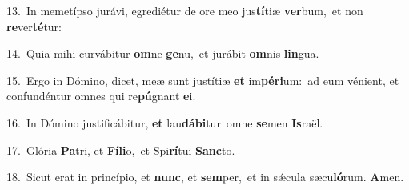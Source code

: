 {\numbfont\textcolor{\numbcolor}{13.}}~In memetípso jurávi, egrediétur de ore meo jus\-\textbf{tí}\-tiæ \textbf{ver}\-bum,~\star et non \textbf{re}\-ver\-\textbf{té}\-tur:\par
{\numbfont\textcolor{\numbcolor}{14.}}~Quia mihi curvábitur \textbf{om}\-ne \textbf{ge}\-nu,~\star et jurábit \textbf{om}\-nis \textbf{lin}\-gua.\par
{\numbfont\textcolor{\numbcolor}{15.}}~Ergo in Dómino, dicet, meæ sunt justítiæ \textbf{et} im\-\textbf{pé}\-\textbf{ri}um:~\star ad eum vénient, et confundéntur omnes qui re\-\textbf{pú}\-gnant \textbf{e}\-i.\par
{\numbfont\textcolor{\numbcolor}{16.}}~In Dómino justificábitur, \textbf{et} lau\-\textbf{dá}\-\textbf{bi}tur~\star omne \textbf{se}\-men \textbf{Is}\-raël.\par
{\numbfont\textcolor{\numbcolor}{17.}}~Glória \textbf{Pa}\-tri, et \textbf{Fí}\-\textbf{li}o,~\star et Spi\-\textbf{rí}\-tui \textbf{Sanc}\-to.\par
{\numbfont\textcolor{\numbcolor}{18.}}~Sicut erat in princípio, et \textbf{nunc}\-, et \textbf{sem}\-per,~\star et in sǽcula sæcu\-\textbf{ló}\-rum. \textbf{A}\-men.\par
